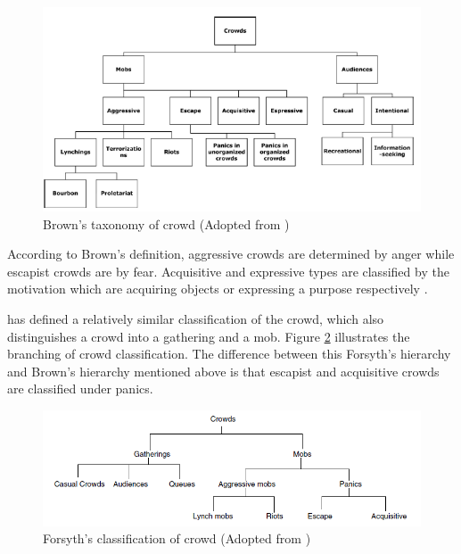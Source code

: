 \begin{figure}[htb!] 
	\centering    
	\includegraphics[width=1.0\textwidth]{BrownCrowdType}
	\caption{Brown's taxonomy of crowd (Adopted from \citet{Pelechano2008})}
	\label{fig:brownCrowdType}
\end{figure}


According to Brown’s definition, aggressive crowds are determined by anger while escapist crowds are by fear. Acquisitive and expressive types are classified by the motivation which are acquiring objects or expressing a purpose respectively \citep{Durupinar2010}.

\citet{Forsyth2009} has defined a relatively similar classification of the crowd, which also distinguishes a crowd into a gathering and a mob. Figure \ref{fig:forsythCrowdType} illustrates the branching of crowd classification. The difference between this Forsyth’s hierarchy and Brown’s hierarchy mentioned above is that escapist and acquisitive crowds are classified under panics. 

\begin{figure}[htb!]
	\centering    
	\includegraphics[width=1.0\textwidth]{ForsythCrowdType}
	\caption{Forsyth's classification of crowd (Adopted from \citet{klupfel2005models})}
	\label{fig:forsythCrowdType}
\end{figure}

